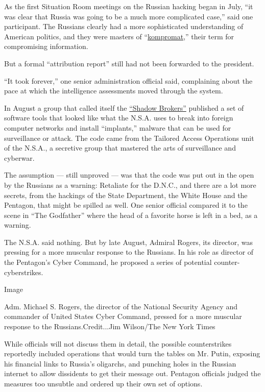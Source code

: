 As the first Situation Room meetings on the Russian hacking began in
July, ``it was clear that Russia was going to be a much more complicated
case,'' said one participant. The Russians clearly had a more
sophisticated understanding of American politics, and they were masters
of
``\href{http://www.nytimes3xbfgragh.onion/2016/12/09/world/europe/vladimir-putin-russia-fake-news-hacking-cybersecurity.html}{kompromat},''
their term for compromising information.

But a formal ``attribution report'' still had not been forwarded to the
president.

``It took forever,'' one senior administration official said,
complaining about the pace at which the intelligence assessments moved
through the system.

In August a group that called itself the
\href{https://www.nytimes3xbfgragh.onion/2016/08/17/us/shadow-brokers-leak-raises-alarming-question-was-the-nsa-hacked.html}{``Shadow
Brokers''} published a set of software tools that looked like what the
N.S.A. uses to break into foreign computer networks and install
``implants,'' malware that can be used for surveillance or attack. The
code came from the Tailored Access Operations unit of the N.S.A., a
secretive group that mastered the arts of surveillance and cyberwar.

The assumption --- still unproved --- was that the code was put out in
the open by the Russians as a warning: Retaliate for the D.N.C., and
there are a lot more secrets, from the hackings of the State Department,
the White House and the Pentagon, that might be spilled as well. One
senior official compared it to the scene in ``The Godfather'' where the
head of a favorite horse is left in a bed, as a warning.

The N.S.A. said nothing. But by late August, Admiral Rogers, its
director, was pressing for a more muscular response to the Russians. In
his role as director of the Pentagon's Cyber Command, he proposed a
series of potential counter-cyberstrikes.

Image

Adm. Michael S. Rogers, the director of the National Security Agency and
commander of United States Cyber Command, pressed for a more muscular
response to the Russians.Credit...Jim Wilson/The New York Times

While officials will not discuss them in detail, the possible
counterstrikes reportedly included operations that would turn the tables
on Mr. Putin, exposing his financial links to Russia's oligarchs, and
punching holes in the Russian internet to allow dissidents to get their
message out. Pentagon officials judged the measures too unsubtle and
ordered up their own set of options.

